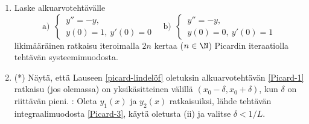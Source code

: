 \begin{enumerate}
\item
Laske alkuarvotehtävälle
\[
\text{a)}\ \ \begin{cases} \,y''=-y, \\ \,y(0)=1,\ y'(0)=0 \end{cases} \quad
\text{b)}\ \ \begin{cases} \,y''=-y, \\ \,y(0)=0,\ y'(0)=1 \end{cases}
\]
likimääräinen ratkaisu iteroimalla $2n$ kertaa ($n\in\N$) Picardin iteraatiolla tehtävän
systeemimuodosta.

\item (*) \label{H-dy-8: ratkaisun yksikäsitteisyys}
Näytä, että Lauseen \ref{picard-lindelöf} oletuksin alkuarvotehtävän \eqref{Picard-1} ratkaisu
(jos olemassa) on yksikäsitteinen välillä $(x_0-\delta,x_0+\delta)$, kun $\delta$ on riittävän
pieni. : Oleta $y_1(x)$ ja $y_2(x)$ ratkaisuiksi, lähde tehtävän integraalimuodosta
\eqref{Picard-3}, käytä oletusta (ii) ja valitse $\delta<1/L$.


\end{enumerate}